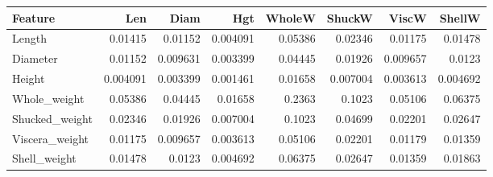 \begin{tabular}{lrrrrrrr}
\toprule
Feature & Len & Diam & Hgt & WholeW & ShuckW & ViscW & ShellW \\
\midrule
Length & 0.01415 & 0.01152 & 0.004091 & 0.05386 & 0.02346 & 0.01175 & 0.01478 \\
Diameter & 0.01152 & 0.009631 & 0.003399 & 0.04445 & 0.01926 & 0.009657 & 0.0123 \\
Height & 0.004091 & 0.003399 & 0.001461 & 0.01658 & 0.007004 & 0.003613 & 0.004692 \\
Whole\_weight & 0.05386 & 0.04445 & 0.01658 & 0.2363 & 0.1023 & 0.05106 & 0.06375 \\
Shucked\_weight & 0.02346 & 0.01926 & 0.007004 & 0.1023 & 0.04699 & 0.02201 & 0.02647 \\
Viscera\_weight & 0.01175 & 0.009657 & 0.003613 & 0.05106 & 0.02201 & 0.01179 & 0.01359 \\
Shell\_weight & 0.01478 & 0.0123 & 0.004692 & 0.06375 & 0.02647 & 0.01359 & 0.01863 \\
\bottomrule
\end{tabular}
